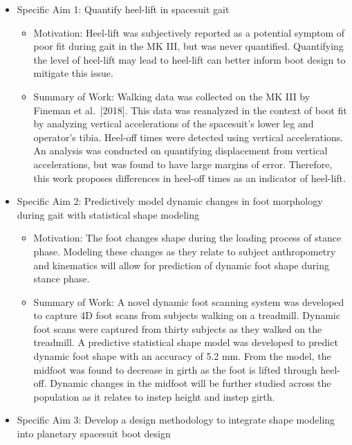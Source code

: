 \documentclass[defaultstyle,11pt]{comps}
\providecommand{\tightlist}{%
  \setlength{\itemsep}{0pt}\setlength{\parskip}{0pt}}
\begin{document}
\begin{itemize}
\tightlist
\item
  Specific Aim 1: Quantify heel-lift in spacesuit gait

  \begin{itemize}
  \tightlist
  \item
    Motivation: Heel-lift was subjectively reported as a potential symptom of poor fit during gait in the MK III, but was never quantified. Quantifying the level of heel-lift may lead to heel-lift can better inform boot design to mitigate this issue.
  \item
    Summary of Work: Walking data was collected on the MK III by Fineman et al.~{[}2018{]}. This data was reanalyzed in the context of boot fit by analyzing vertical accelerations of the spacesuit's lower leg and operator's tibia. Heel-off times were detected using vertical accelerations. An analysis was conducted on quantifying displacement from vertical accelerations, but was found to have large margins of error. Therefore, this work proposes differences in heel-off times as an indicator of heel-lift.
  \end{itemize}
\item
  Specific Aim 2: Predictively model dynamic changes in foot morphology during gait with statistical shape modeling

  \begin{itemize}
  \tightlist
  \item
    Motivation: The foot changes shape during the loading process of stance phase. Modeling these changes as they relate to subject anthropometry and kinematics will allow for prediction of dynamic foot shape during stance phase.
  \item
    Summary of Work: A novel dynamic foot scanning system was developed to capture 4D foot scans from subjects walking on a treadmill. Dynamic foot scans were captured from thirty subjects as they walked on the treadmill. A predictive statistical shape model was developed to predict dynamic foot shape with an accuracy of 5.2 mm. From the model, the midfoot was found to decrease in girth as the foot is lifted through heel-off. Dynamic changes in the midfoot will be further studied across the population as it relates to instep height and instep girth.
  \end{itemize}
\item
  Specific Aim 3: Develop a design methodology to integrate shape modeling into planetary spacesuit boot design


\end{itemize}
\end{document}
